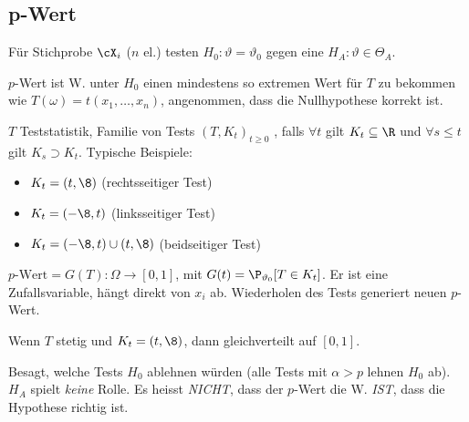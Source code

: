 \newpage
\subsection{p-Wert}
Für Stichprobe $\cX_i$ ($n$ el.) testen $H_0 : \vartheta = \vartheta_0$ gegen eine $H_A : \vartheta \in \Theta_A$.

$p$-Wert ist W. unter $H_0$ einen mindestens so extremen Wert für $T$ zu bekommen wie $T(\omega) = t(x_1, \ldots, x_n)$, angenommen, dass die Nullhypothese korrekt ist.

$T$ Teststatistik, Familie von Tests $(T, K_t)_{t \geq 0}$ , falls $\forall t$ gilt $K_t \subseteq \R$ und $\forall s \leq t$ gilt $K_s \supset K_t$.
Typische Beispiele:
\begin{itemize}
    \item $K_t = (t, \8)$ (rechtsseitiger Test)
    \item $K_t = (-\8, t)$ (linksseitiger Test)
    \item $K_t = (-\8, t) \cup (t, \8)$ (beidseitiger Test)
\end{itemize}

\shortdefinition[p-Wert] $p\text{-Wert} = G(T) : \Omega \rightarrow [0, 1]$, mit $G(t) = \P_{\vartheta_0}[T \in K_t]$.
Er ist eine Zufallsvariable, hängt direkt von $x_i$ ab. Wiederholen des Tests generiert neuen $p$-Wert.

Wenn $T$ stetig und $K_t = (t, \8)$, dann gleichverteilt auf $[0, 1]$.

\inlineintuition Besagt, welche Tests $H_0$ ablehnen würden (alle Tests mit $\alpha > p$ lehnen $H_0$ ab). $H_A$ spielt \textit{keine} Rolle.
Es heisst \textit{NICHT}, dass der $p$-Wert die W. \textit{IST}, dass die Hypothese richtig ist.

